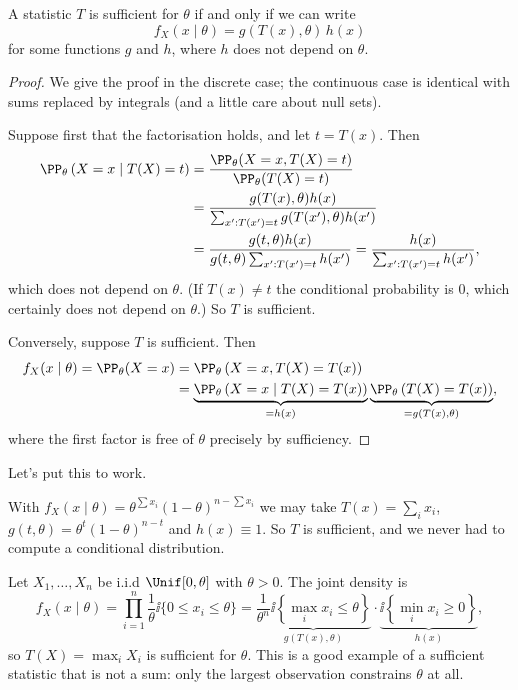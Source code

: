 \begin{theorem}
  A statistic $T$ is sufficient for $\theta$ if and only if we can write
  $$
  f_X(x \mid \theta) = g(T(x), \theta)\, h(x)
  $$
  for some functions $g$ and $h$, where $h$ does not depend on $\theta$.
\end{theorem}
\begin{proof}
  We give the proof in the discrete case; the continuous case is identical with sums replaced by integrals (and a little care about null sets).

  Suppose first that the factorisation holds, and let $t = T(x)$. Then
  \begin{align*}
    \PP_\theta\left(X = x \mid T(X) = t\right) &= \frac{\PP_\theta(X = x, T(X) = t)}{\PP_\theta(T(X) = t)}\\
    &= \frac{g(T(x), \theta)h(x)}{\sum_{x' : T(x') = t} g(T(x'), \theta)h(x')}\\
    &= \frac{g(t, \theta)h(x)}{g(t,\theta)\sum_{x' : T(x') = t}h(x')} = \frac{h(x)}{\sum_{x' : T(x') = t}h(x')},
  \end{align*}
  which does not depend on $\theta$. (If $T(x) \neq t$ the conditional probability is $0$, which certainly does not depend on $\theta$.) So $T$ is sufficient.

  Conversely, suppose $T$ is sufficient. Then
  \begin{align*}
    f_X(x\mid\theta) = \PP_\theta(X = x) &= \PP_\theta\left(X = x, T(X) = T(x)\right)\\
    &= \underbrace{\PP_\theta\left(X = x \mid T(X) = T(x)\right)}_{= h(x)}\underbrace{\PP_\theta\left(T(X) = T(x)\right)}_{= g(T(x), \theta)},
  \end{align*}
  where the first factor is free of $\theta$ precisely by sufficiency. \qedhere
\end{proof}

Let's put this to work.

\begin{example}
  With $f_X(x \mid \theta) = \theta^{\sum x_i}(1-\theta)^{n - \sum x_i}$ we may take $T(x) = \sum_i x_i$, $g(t, \theta) = \theta^t(1-\theta)^{n-t}$ and $h(x) \equiv 1$. So $T$ is sufficient, and we never had to compute a conditional distribution.
\end{example}

\begin{example}[Uniform on {$[0,\theta]$}]
  Let $X_1, \dots, X_n$ be i.i.d $\Unif[0, \theta]$ with $\theta > 0$. The joint density is
  $$
  f_X(x \mid \theta) = \prod_{i=1}^n \frac{1}{\theta}\ii\{0 \leq x_i \leq \theta\} = \underbrace{\frac{1}{\theta^n}\ii\left\{\max_i x_i \leq \theta\right\}}_{g(T(x), \theta)} \cdot \underbrace{\ii\left\{\min_i x_i \geq 0\right\}}_{h(x)},
  $$
  so $T(X) = \max_i X_i$ is sufficient for $\theta$. This is a good example of a sufficient statistic that is not a sum: only the largest observation constrains $\theta$ at all.
\end{example}

